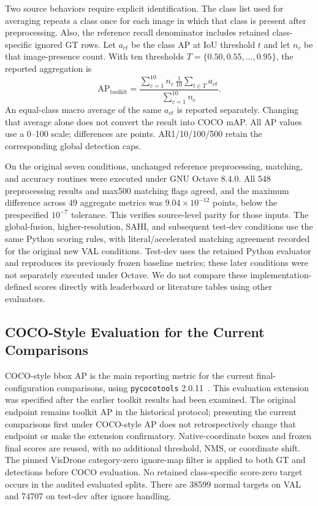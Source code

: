 \documentclass[journal]{IEEEtran}
\newcommand{\APlit}{\mathrm{AP}_{\mathrm{toolkit}}}
\begin{document}
Two source behaviors require explicit identification. The class list used for averaging repeats a class once for each image in which that class is present after preprocessing. Also, the reference recall denominator includes retained class-specific ignored GT rows. Let $a_{ct}$ be the class AP at IoU threshold $t$ and let $n_c$ be that image-presence count. With ten thresholds $T=\{0.50,0.55,\ldots,0.95\}$, the reported aggregation is
\begin{equation}
\APlit=\frac{\sum_{c=1}^{10} n_c\,\frac1{10}\sum_{t\in T}a_{ct}}
                   {\sum_{c=1}^{10}n_c}.
\label{eq:metric}
\end{equation}
An equal-class macro average of the same $a_{ct}$ is reported separately. Changing that average alone does not convert the result into COCO mAP. All AP values use a 0--100 scale; differences are points. AR1/10/100/500 retain the corresponding global detection caps.

On the original seven conditions, unchanged reference preprocessing, matching, and accuracy routines were executed under GNU Octave 8.4.0. All 548 preprocessing results and max500 matching flags agreed, and the maximum difference across 49 aggregate metrics was $9.04\times10^{-12}$ points, below the prespecified $10^{-7}$ tolerance. This verifies source-level parity for those inputs. The global-fusion, higher-resolution, SAHI, and subsequent test-dev conditions use the same Python scoring rules, with literal/accelerated matching agreement recorded for the original new VAL conditions. Test-dev uses the retained Python evaluator and reproduces its previously frozen baseline metrics; these later conditions were not separately executed under Octave. We do not compare these implementation-defined scores directly with leaderboard or literature tables using other evaluators.

\subsection{COCO-Style Evaluation for the Current Comparisons}
COCO-style bbox AP is the main reporting metric for the current final-configuration comparisons, using \texttt{pycocotools} 2.0.11~\cite{lin2014coco}. This evaluation extension was specified after the earlier toolkit results had been examined. The original endpoint remains toolkit AP in the historical protocol; presenting the current comparisons first under COCO-style AP does not retrospectively change that endpoint or make the extension confirmatory. Native-coordinate boxes and frozen final scores are reused, with no additional threshold, NMS, or coordinate shift. The pinned VisDrone category-zero ignore-map filter is applied to both GT and detections before COCO evaluation. No retained class-specific score-zero target occurs in the audited evaluated splits. There are 38599 normal targets on VAL and 74707 on test-dev after ignore handling.
\end{document}
